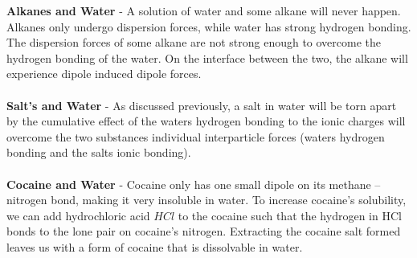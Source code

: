 \documentclass{article}
\begin{document}
\noindent\textbf{Alkanes and Water} - A solution of water and some alkane will never happen. Alkanes only undergo dispersion forces, while water has strong hydrogen bonding. The dispersion forces of some alkane are not strong enough to overcome the hydrogen bonding of the water. On the interface between the two, the alkane will experience dipole induced dipole forces.\\
\\
\textbf{Salt's and Water} - As discussed previously, a salt in water will be torn apart by the cumulative effect of the waters hydrogen bonding to the ionic charges will overcome the two substances individual interparticle forces (waters hydrogen bonding and the salts ionic bonding).\\
\\
\textbf{Cocaine and Water} - Cocaine only has one small dipole on its methane -- nitrogen bond, making it very insoluble in water. To increase cocaine's solubility, we can add hydrochloric acid $HCl$ to the cocaine such that the hydrogen in HCl bonds to the lone pair on cocaine's nitrogen. Extracting the cocaine salt formed leaves us with a form of cocaine that is dissolvable in water.
\begin{qq}

	\begin{center}

		\hspace{20pt}\begin{minipage}{7.2cm}


		\end{minipage}
		\begin{minipage}{7cm}


		\end{minipage}

	\end{center}

\end{qq}
\end{document}
